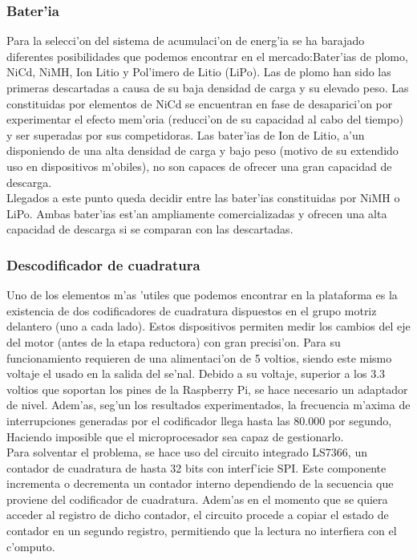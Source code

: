\documentclass[twoside,12pt]{article}
\begin{document}
\subsubsection{Bater'ia}
Para la selecci'on del sistema de acumulaci'on de energ'ia se ha barajado diferentes posibilidades que podemos encontrar en el mercado:Bater'ias de plomo, NiCd, NiMH, Ion Litio y Pol'imero de Litio (LiPo). Las de plomo han sido las primeras descartadas a causa de su baja densidad de carga y su elevado peso. Las constituidas por elementos de NiCd se encuentran en fase de desaparici'on por experimentar el efecto mem'oria (reducci'on de su capacidad al cabo del tiempo) y ser superadas por sus competidoras. Las bater'ias de Ion de Litio, a'un disponiendo de una alta densidad de carga y bajo peso (motivo de su extendido uso en dispositivos m'obiles), no son capaces de ofrecer una gran capacidad de descarga. \\

Llegados a este punto queda decidir entre las bater'ias constituidas por NiMH o LiPo. Ambas bater'ias est'an ampliamente comercializadas y ofrecen una alta capacidad de descarga si se comparan con las descartadas.



\subsubsection{Descodificador de cuadratura}
Uno de los elementos m'as 'utiles que podemos encontrar en la plataforma es la existencia de dos codificadores de cuadratura dispuestos en el grupo motriz delantero (uno a cada lado). Estos dispositivos permiten medir los cambios del eje del motor (antes de la etapa reductora) con gran precisi'on. Para su funcionamiento requieren de una alimentaci'on de 5 voltios, siendo este mismo voltaje el usado en la salida del se'nal. Debido a su voltaje, superior a los 3.3 voltios que soportan los pines de la Raspberry Pi, se hace necesario un adaptador de nivel. Adem'as, seg'un los resultados experimentados, la frecuencia m'axima de interrupciones generadas por el codificador llega hasta las 80.000 por segundo, Haciendo imposible que el microprocesador sea capaz de gestionarlo.\\

Para solventar el problema, se hace uso del circuito integrado LS7366, un contador de cuadratura de hasta 32 bits con interf'icie SPI. Este componente incrementa o decrementa un contador interno dependiendo de la secuencia que proviene del codificador de cuadratura. Adem'as en el momento que se quiera acceder al registro de dicho contador, el circuito procede a copiar el estado de contador en un segundo registro, permitiendo que la lectura no interfiera con el c'omputo.\\
\end{document}
